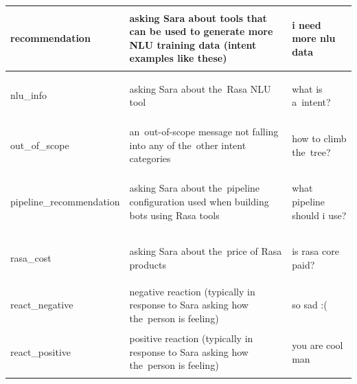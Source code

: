 \documentclass[bsc,frontabs,singlespacing,parskip,deptreport]{infthesis}
\begin{document}
{\begin{center}
\begin{longtable}{p{}|p{}|p{}}
\begin{spverbatim}
    recommendation\end{spverbatim} & asking Sara about tools that can be used to generate more NLU training data (intent examples like these) & \begin{spverbatim}i need more nlu data\end{spverbatim} \\
    \hline
    \begin{spverbatim}nlu_info\end{spverbatim} & asking Sara about the~Rasa NLU tool & \begin{spverbatim}what is a~intent?\end{spverbatim} \\
    \hline
    \begin{spverbatim}out_of_scope\end{spverbatim} & an~out-of-scope message not falling into any of the~other intent categories & \begin{spverbatim}how to climb the~tree?\end{spverbatim} \\
    \hline
    \begin{spverbatim}pipeline_recommendation\end{spverbatim} & asking Sara about the~pipeline configuration used when building bots using Rasa tools & \begin{spverbatim}what pipeline should i use?\end{spverbatim} \\
    \hline
    \begin{spverbatim}rasa_cost\end{spverbatim} & asking Sara about the~price of Rasa products & \begin{spverbatim}is rasa core paid?\end{spverbatim} \\
    \hline
    \begin{spverbatim}react_negative\end{spverbatim} & negative reaction (typically in response to Sara asking how the~person is feeling) & \begin{spverbatim}so sad :(\end{spverbatim} \\
    \hline
    \begin{spverbatim}react_positive\end{spverbatim} & positive reaction (typically in response to Sara asking how the~person is feeling) & \begin{spverbatim}you are cool man\end{spverbatim} \\

\end{longtable}
\end{center}}
\end{document}
